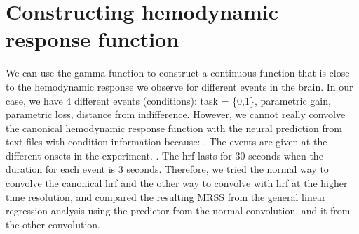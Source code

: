 
\section{Constructing hemodynamic response function}
We can use the gamma function to construct a continuous function that is close to 
the hemodynamic response we observe for different events in the brain. In our case,
we have 4 different events (conditions): task = \{0,1\}, parametric gain, parametric loss, distance 
from indifference. However, we cannot really convolve the canonical hemodynamic response function with the neural prediction from text files with condition information because:\newline
\newline
{}. The events are given at the different onsets in the experiment.\newline
{}. The hrf lasts for 30 seconds when the duration for each event is 3 seconds.\newline
\newline
Therefore, we tried the normal way to convolve the canonical hrf and the other way to convolve with hrf at the higher time resolution, and compared the resulting MRSS from the general linear regression analysis using the predictor from the normal convolution, and it from the other convolution.\newline


